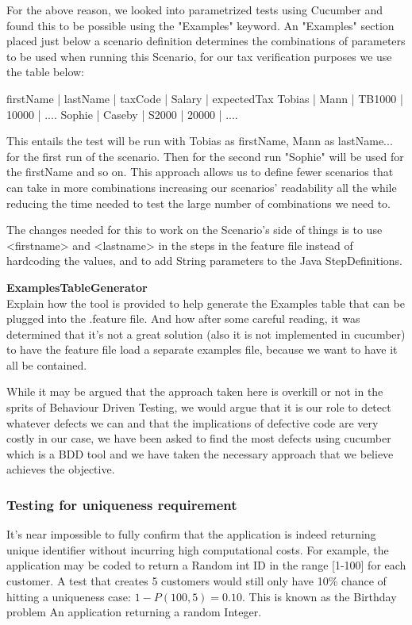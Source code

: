 For the above reason, we looked into parametrized tests using Cucumber and found this to be possible using the "Examples" keyword. 
An "Examples" section placed just below a scenario definition determines the combinations of parameters to be used when running this Scenario, for our tax verification purposes we use the table below: 
\begin{javacode}
firstName	| lastName	| taxCode 	| Salary 	| expectedTax
Tobias 		| Mann 		| TB1000 	| 10000 	| ....
Sophie		| Caseby	| S2000 	| 20000		| ....
\end{javacode}
This entails the test will be run with Tobias as firstName, Mann as lastName... for the first run of the scenario. Then for the second run "Sophie" will be used for the firstName and so on. 
This approach allows us to define fewer scenarios that can take in more combinations increasing our scenarios' readability all the while reducing the time needed to test the large number of combinations we need to. 

The changes needed for this to work on the Scenario's side of things is to use <firstname> and <lastname> in the steps in the feature file instead of hardcoding the values, and to add String parameters to the Java StepDefinitions.


\textbf{ExamplesTableGenerator\\}
Explain how the tool is provided to help generate the Examples table that can be plugged into the .feature file. And how after some careful reading, it was determined that it's not a great solution (also it is not implemented in cucumber) to have the feature file load a separate examples file, because we want to have it all be contained. 
\par
While it may be argued that the approach taken here is overkill or not in the sprits of Behaviour Driven Testing, we would argue that it is our role to detect whatever defects we can and that the implications of defective code are very costly in our case, we have been asked to find the most defects using cucumber which is a BDD tool and we have taken the necessary approach that we believe achieves the objective. 

\subsubsection{Testing for uniqueness requirement}
It's near impossible to fully confirm that the application is indeed returning unique identifier without incurring high computational costs. For example, the application may be coded to return a Random int ID in the range [1-100] for each customer. A test that creates 5 customers would still only have 10\% chance of hitting a uniqueness case: 
$1 - P(100,5) = 0.10$. This is known as the Birthday problem %
An application returning a random Integer. 


